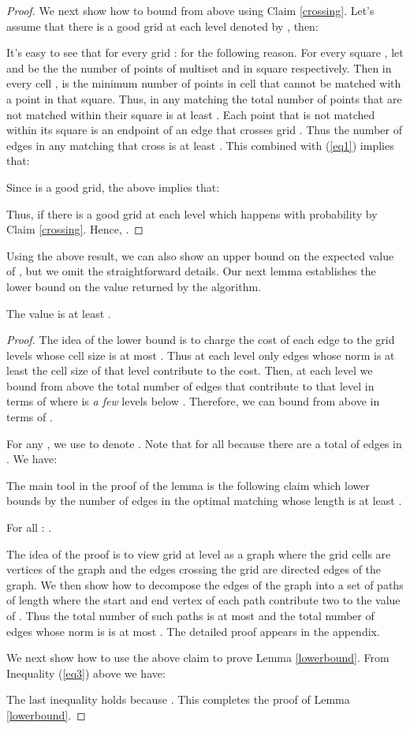 \documentclass[oribibl]{llncs}
\begin{document}
\begin{proof}
We next show how to bound  from above using Claim \ref{crossing}.
Let's assume that there is a good grid at each level  denoted by ,
then:


It's easy to see that for every grid : 
 for the
following reason. For every square , let  and  be the
the number of points of multiset  and  in square  respectively. 
Then in every cell ,  is the minimum number of points
in cell  that cannot be matched with a point in that square. Thus, in any
matching the total number of points that are not matched within their square is
at least . Each
point that is not matched within its square is an endpoint of an edge that
crosses grid . Thus the number of edges in any matching that cross  is
at least . This combined with (\ref{eq1}) implies 
that:

Since  is a good grid, the above implies that:

Thus, 
if there is a good grid at each level  which
happens with probability  by Claim \ref{crossing}.
Hence, .
\end{proof}
Using the above result, we can also show an upper bound on the expected
value of , but we omit the straightforward details. Our next lemma
establishes the lower bound on the value returned by the algorithm.
\begin{lemma}\label{lowerbound}
The value 
is at least .
\end{lemma}
\begin{proof}
The idea of the lower bound is to charge the cost of each edge  to
the grid levels whose cell size is at most . Thus at each level
only edges whose  norm is at least the cell size of
that level contribute to the cost.
Then, at each level  we bound from above the total number of
edges that contribute to that level in terms of
 where  is
\textit{a few} levels below . Therefore, we can bound 
from above in terms of .

For any , we use  to denote . 
Note that  for all  because there are a total of
 edges in .
We have:


The main tool in the proof of the lemma is the following claim which lower
bounds 
by the number of edges in the optimal matching  whose length is at least
.
 
\begin{myclaim}\label{cl2}
 For all :
.
\end{myclaim}
The idea of the proof is to view grid  at level  as a graph where the
grid cells are vertices of the graph and the edges crossing the grid are
directed edges of the graph. We then show how to decompose the edges of the
graph into a set of paths of length  where the start and end vertex of
each path contribute two to the value of . Thus the total number of
such paths is at most  and the total number of edges whose 
norm is  is at most . The detailed proof appears in
the appendix.

We next show how to use the above claim to prove Lemma \ref{lowerbound}.
From Inequality (\ref{eq3}) above we have:

The last inequality holds because .
This completes the proof of Lemma \ref{lowerbound}.
\end{proof}
\end{document}
